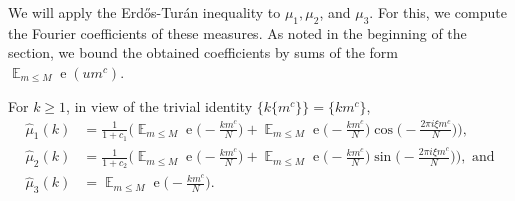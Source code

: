 \documentclass[letterpaper, 12pt]{article}
\theoremstyle{plain}
\theoremstyle{definition}
\theoremstyle{plain}
\theoremstyle{plain}
\numberwithin{equation}{section}
\newcommand{\Erdos}{Erd\H{o}s}
\newcommand{\Turan}{Tur{\'a}n}
\renewcommand{\leq}{\leqslant}
\renewcommand{\geq}{\geqslant}
\newcommand{\E}{\mathbb{E}}
\newcommand{\1}{\textbf{1}}
\DeclareMathOperator{\e}{e}
\begin{document}
We will apply the \Erdos-\Turan{} inequality to $\mu_1, \mu_2$, and $\mu_3$. For this, we compute the Fourier coefficients of these measures. As noted in the beginning of the section, we bound the obtained coefficients by sums of the form $\mathop{\E}_{m \leq M} \e(um^c)$.

For $k \geq 1$, in view of the trivial identity $\bigl\{k\{m^c\}\bigr\} = \{km^c\}$, 
\begin{align*}
    \hat{\mu}_1(k) &= \frac{1}{1 + c_1} \biggl(\mathop{\E}_{m \leq M}\e\biggl(\! -\frac{k m^c}{N} \biggr) + \mathop{\E}_{m \leq M} \e\biggl(\! -\frac{k m^c}{N} \biggr) \cos\biggl(\! -\frac{2\pi i \xi m^c}{N} \biggr) \biggr),\\
    \hat{\mu}_2(k) &= \frac{1}{1 + c_2} \biggl(\mathop{\E}_{m \leq M} \e\biggl(\! -\frac{km^c}{N} \biggr) + \mathop{\E}_{m \leq M} \e\biggl(\! -\frac{km^c}{N} \biggr) \sin\biggl(\! -\frac{2\pi i \xi m^c}{N} \biggr) \biggr), \text{ and}\\
    \hat{\mu}_3(k) &= \mathop{\E}_{m \leq M} \e\biggl(\! -\frac{km^c}{N} \biggr). 
\end{align*} 
\end{document}
